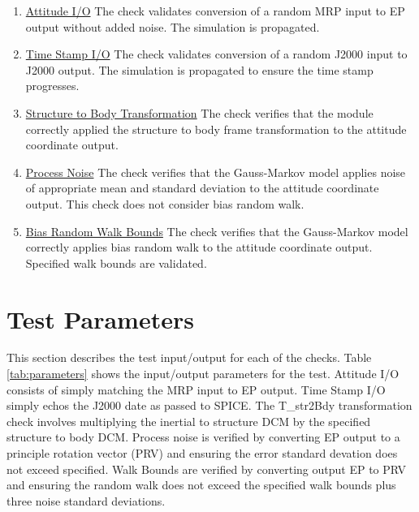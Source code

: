 \documentclass[]{BasiliskReportMemo}
\begin{document}
\begin{enumerate}
	\item \underline{Attitude I/O} The check validates conversion of a random MRP input to EP output without added noise. The simulation is propagated.
	\item \underline{Time Stamp I/O} The check validates conversion of a random J2000 input to J2000 output. The simulation is propagated to ensure the time stamp progresses.
	\item \underline{Structure to Body Transformation} The check verifies that the module correctly applied the structure to body frame transformation to the attitude coordinate output.
	\item \underline{Process Noise} The check verifies that the Gauss-Markov model applies noise of appropriate mean and standard deviation to the attitude coordinate output. This check does not consider bias random walk.
	\item \underline{Bias Random Walk Bounds} The check verifies that the Gauss-Markov model correctly applies bias random walk to the attitude coordinate output. Specified walk bounds are validated.
\end{enumerate} 

\section{Test Parameters}

This section describes the test input/output for each of the checks. Table \ref{tab:parameters} shows the input/output parameters for the test. Attitude I/O consists of simply matching the MRP input to EP output. Time Stamp I/O simply echos the J2000 date as passed to SPICE. The T\_str2Bdy transformation check involves multiplying the inertial to structure DCM by the specified structure to body DCM. Process noise is verified by converting EP output to a principle rotation vector (PRV) and ensuring the error standard devation does not exceed specified. Walk Bounds are verified by converting output EP to PRV and ensuring the random walk does not exceed the specified walk bounds plus three noise standard deviations.
\end{document}
